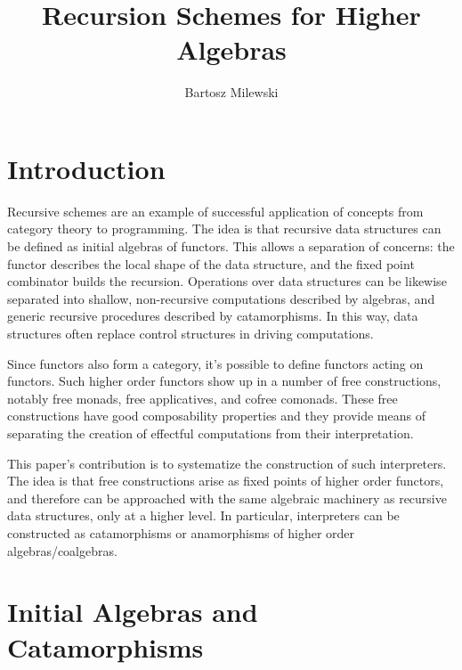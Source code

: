 \documentclass[letterpaper, 10 pt, conference]{ieeeconf}
\begin{document}
\title{Recursion Schemes for Higher Algebras}

\author{Bartosz Milewski}

\maketitle

\section{Introduction}

Recursive schemes \cite{bananas} are an example of successful application of concepts from category theory to programming. The idea is that recursive data structures can be defined as initial algebras of functors. This allows a separation of concerns: the functor describes the local shape of the data structure, and the fixed point combinator builds the recursion. Operations over data structures can be likewise separated into shallow, non-recursive computations described by algebras, and generic recursive procedures described by catamorphisms. In this way, data structures often replace control structures in driving computations.

Since functors also form a category, it's possible to define functors acting on functors. Such higher order functors show up in a number of free constructions, notably free monads, free applicatives, and cofree comonads. These free constructions have good composability properties and they provide means of separating the creation of effectful computations from their interpretation.

This paper's contribution is to systematize the construction of such interpreters. The idea is that free constructions arise as fixed points of higher order functors, and therefore can be approached with the same algebraic machinery as recursive data structures, only at a higher level. In particular, interpreters can be constructed as catamorphisms or anamorphisms of higher order algebras/coalgebras.

\section{Initial Algebras and Catamorphisms}
\end{document}
